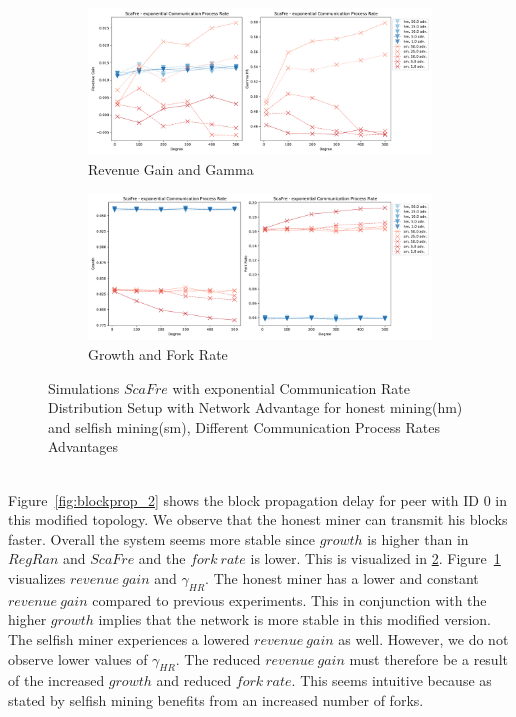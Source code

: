 \begin{figure}[tbp]
	\begin{subfigure}[b]{\textwidth}
		\includegraphics[width=\textwidth]{figures/revenue_gamma_barabasi_bc_dc.pdf}
		\caption{Revenue Gain and Gamma}
		\label{fig:revgain_bc_dc}
	\end{subfigure}
	\begin{subfigure}[b]{\textwidth}
		\includegraphics[width=\textwidth]{figures/growth_forkrate_barabasi_bc_dc.pdf}
		\caption{Growth and Fork Rate}
		\label{fig:growth_bc_dc}
	\end{subfigure}
\caption{Simulations $ScaFre$ with exponential Communication Rate Distribution Setup with Network Advantage for honest mining(hm) and selfish mining(sm), Different Communication Process Rates Advantages}
\label{fig:bc_dc}
\end{figure}\\
Figure~\ref{fig:blockprop_2} shows the block propagation delay for peer with ID $0$ in this modified topology. We observe that the honest miner can transmit his blocks faster. Overall the system seems more stable since $growth$ is higher than in $RegRan$ and $ScaFre$ and the $fork~rate$ is lower. This is visualized in \ref{fig:growth_bc_dc}. Figure~\ref{fig:revgain_bc_dc} visualizes $revenue~gain$ and $\gamma_{HR}$. The honest miner has a lower and constant $revenue~gain$ compared to previous experiments. This in conjunction with the higher $growth$ implies that the network is more stable in this modified version. The selfish miner experiences a lowered $revenue~gain$ as well. However, we do not observe lower values of $\gamma_{HR}$. The reduced $revenue~gain$ must therefore be a result of the increased $growth$ and reduced $fork~rate$. This seems intuitive because as stated by  selfish mining benefits from an increased number of forks.\\
